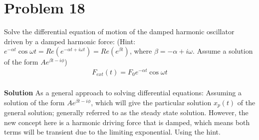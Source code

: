 \documentclass[]{article}
\newcommand{\bd}{\textbf}
\begin{document}
	\section{Problem 18}
	
	Solve the differential equation of motion of the damped harmonic oscillator driven by a damped harmonic force: (Hint: $ e^{-\alpha t} \cos \omega t = Re(e^{-\alpha t + i \omega t}) = Re(e^{\beta t}) $, where $ \beta = -\alpha + i \omega $. Assume a solution of the form $ Ae^{\beta t - i \phi} $)
	\begin{equation}
		\begin{split}
			F_{ext}(t) = F_0 e^{-\alpha t} \cos \omega t  \\		
		\end{split}
	\end{equation}

	\bd{Solution} As a general approach to solving differential equations: Assuming a solution of the form $ Ae^{\beta t - i \phi} $, which will give the particular solution $ x_p(t) $ of the general solution; generally referred to as the steady state solution. However, the new concept here is a harmonic driving force that is damped, which means both terms will be transient due to the limiting exponential. Using the hint.
	
\end{document}
